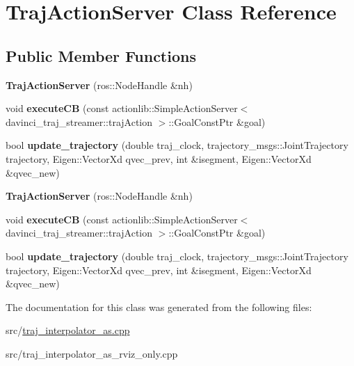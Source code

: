 \hypertarget{class_traj_action_server}{\section{Traj\-Action\-Server Class Reference}
\label{class_traj_action_server}
}
\subsection*{Public Member Functions}
\begin{DoxyCompactItemize}
\item 
\hypertarget{class_traj_action_server_afd4c29595fad3271b287c327822e9d33}{{\bfseries Traj\-Action\-Server} (ros\-::\-Node\-Handle \&nh)}\label{class_traj_action_server_afd4c29595fad3271b287c327822e9d33}

\item 
\hypertarget{class_traj_action_server_a4d9a54bee35dc88322bebf51c093abcc}{void {\bfseries execute\-C\-B} (const actionlib\-::\-Simple\-Action\-Server$<$ davinci\-\_\-traj\-\_\-streamer\-::traj\-Action $>$\-::Goal\-Const\-Ptr \&goal)}\label{class_traj_action_server_a4d9a54bee35dc88322bebf51c093abcc}

\item 
\hypertarget{class_traj_action_server_ae5e5c2bd361941e34b852853d5bdc7ab}{bool {\bfseries update\-\_\-trajectory} (double traj\-\_\-clock, trajectory\-\_\-msgs\-::\-Joint\-Trajectory trajectory, Eigen\-::\-Vector\-Xd qvec\-\_\-prev, int \&isegment, Eigen\-::\-Vector\-Xd \&qvec\-\_\-new)}\label{class_traj_action_server_ae5e5c2bd361941e34b852853d5bdc7ab}

\item 
\hypertarget{class_traj_action_server_afd4c29595fad3271b287c327822e9d33}{{\bfseries Traj\-Action\-Server} (ros\-::\-Node\-Handle \&nh)}\label{class_traj_action_server_afd4c29595fad3271b287c327822e9d33}

\item 
\hypertarget{class_traj_action_server_a4d9a54bee35dc88322bebf51c093abcc}{void {\bfseries execute\-C\-B} (const actionlib\-::\-Simple\-Action\-Server$<$ davinci\-\_\-traj\-\_\-streamer\-::traj\-Action $>$\-::Goal\-Const\-Ptr \&goal)}\label{class_traj_action_server_a4d9a54bee35dc88322bebf51c093abcc}

\item 
\hypertarget{class_traj_action_server_ae5e5c2bd361941e34b852853d5bdc7ab}{bool {\bfseries update\-\_\-trajectory} (double traj\-\_\-clock, trajectory\-\_\-msgs\-::\-Joint\-Trajectory trajectory, Eigen\-::\-Vector\-Xd qvec\-\_\-prev, int \&isegment, Eigen\-::\-Vector\-Xd \&qvec\-\_\-new)}\label{class_traj_action_server_ae5e5c2bd361941e34b852853d5bdc7ab}

\end{DoxyCompactItemize}


The documentation for this class was generated from the following files\-:\begin{DoxyCompactItemize}
\item 
src/\hyperlink{traj__interpolator__as_8cpp}{traj\-\_\-interpolator\-\_\-as.\-cpp}\item 
src/traj\-\_\-interpolator\-\_\-as\-\_\-rviz\-\_\-only.\-cpp\end{DoxyCompactItemize}
